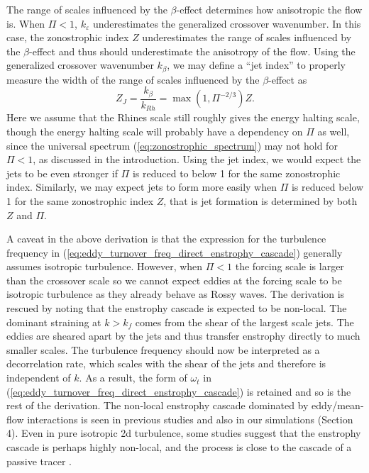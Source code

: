 \documentclass{jfm}
\begin{document}
The range of scales influenced by the $\beta$-effect determines
how anisotropic the flow is. When $\Pi<1$, 
$k_{\varepsilon}$ underestimates the generalized crossover wavenumber.
In this case, the zonostrophic index $Z$ underestimates the range
of scales influenced by the $\beta$-effect and thus should underestimate the anisotropy
of the flow. Using the generalized crossover wavenumber $k_{\beta}$,
we may define a ``jet index'' to properly measure the width of the
range of scales influenced by the $\beta$-effect as
\begin{equation}
Z_{J}=\frac{k_{\beta}}{k_{Rh}}=\max(1,\Pi^{-2/3})Z.\label{eq:jet index}
\end{equation}
Here we assume that the Rhines scale still roughly gives the energy
halting scale, though the energy halting scale will probably have a
dependency on $\Pi$ as well, since the universal spectrum (\ref{eq:zonostrophic_spectrum})
may not hold for $\Pi<1$, as discussed in the introduction. 
Using the jet index, we would
expect the jets to be even stronger if $\Pi$ is reduced to below 1 for
the same zonostrophic index. Similarly, we may expect jets 
to form more easily when $\Pi$ is reduced
below 1 for the same zonostrophic index $Z$, that is jet
formation is determined by both $Z$ and $\Pi$. 

A caveat in the above derivation is that the expression for the turbulence frequency in
(\ref{eq:eddy_turnover_freq_direct_enstrophy_cascade}) generally 
assumes isotropic turbulence. However, when $\Pi<1$
the forcing scale is larger than the crossover scale
so we cannot expect eddies at the forcing scale to be isotropic
turbulence as they already behave as Rossy waves.
The derivation is rescued by noting that the enstrophy cascade is expected
to be non-local. The dominant straining at $k>k_{f}$ comes from
the shear of the largest scale jets. The eddies are sheared apart
by the jets and thus transfer enstrophy directly to much smaller scales.
The turbulence frequency should now be interpreted as a
decorrelation rate, which scales with the shear of the jets and therefore
is independent of $k$. As a result, the form of $\omega_{t}$ in (\ref{eq:eddy_turnover_freq_direct_enstrophy_cascade})
is retained and so is the rest of the derivation. The non-local enstrophy
cascade dominated by eddy/mean-flow interactions is seen in previous
studies \citep{Manz2009} and also in our simulations (Section 4).
Even in pure isotropic 2d turbulence, some studies suggest that the enstrophy
cascade is perhaps highly non-local, and the process is close to the cascade
of a passive tracer \citep{Borue1993,Falkovich1994}.
\end{document}
